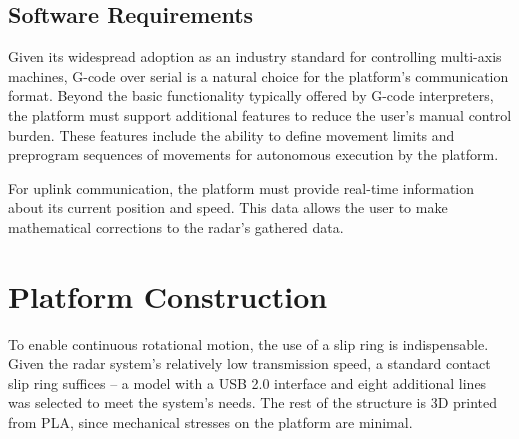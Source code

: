 \subsection{Software Requirements}

Given its widespread adoption as an industry standard for controlling multi-axis machines, G-code over serial is a natural choice for the platform's communication format. Beyond the basic functionality typically offered by G-code interpreters, the platform must support additional features to reduce the user's manual control burden. These features include the ability to define movement limits and preprogram sequences of movements for autonomous execution by the platform.

For uplink communication, the platform must provide real-time information about its current position and speed. This data allows the user to make mathematical corrections to the radar's gathered data.


\section{Platform Construction}


To enable continuous rotational motion, the use of a slip ring is indispensable. Given the radar system's relatively low transmission speed, a standard contact slip ring suffices -- a model with a USB 2.0 interface and eight additional lines was selected to meet the system's needs. The rest of the structure is 3D printed from PLA, since mechanical stresses on the platform are minimal.


